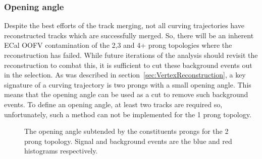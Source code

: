 \subsubsection{Opening angle}
\label{subsubsec:OpeningAngle}
Despite the best efforts of the track merging, not all curving trajectories have reconstructed tracks which are successfully merged.  So, there will be an inherent ECal OOFV contamination of the 2,3 and 4+ prong topologies where the reconstruction has failed.  While future iterations of the analysis should revisit the reconstruction to combat this, it is sufficient to cut these background events out in the selection.  As was described in section~\ref{sec:VertexReconstruction}, a key signature of a curving trajectory is two prongs with a small opening angle.  This means that the opening angle can be used as a cut to remove such background events.  To define an opening angle, at least two tracks are required so, unfortunately, such a method can not be implemented for the 1 prong topology.
\newline
\newline
\begin{figure}[b!]
  \centering
  \caption{The opening angle subtended by the constituents prongs for the 2 prong topology.  Signal and background events are the blue and red histograms respectively.}
  \label{fig:Sel2OpeningAngle}
\end{figure}
